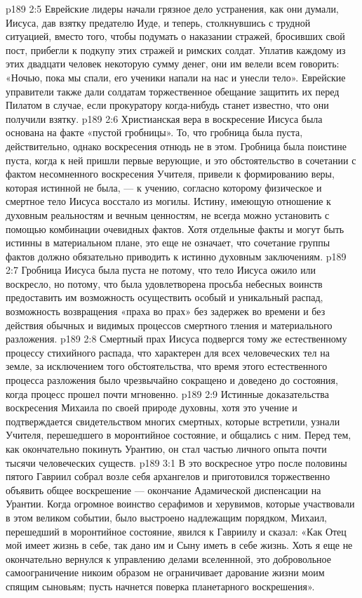 \vs p189 2:5 Еврейские лидеры начали грязное дело устранения, как они думали, Иисуса, дав взятку предателю Иуде, и теперь, столкнувшись с трудной ситуацией, вместо того, чтобы подумать о наказании стражей, бросивших свой пост, прибегли к подкупу этих стражей и римских солдат. Уплатив каждому из этих двадцати человек некоторую сумму денег, они им велели всем говорить: «Ночью, пока мы спали, его ученики напали на нас и унесли тело». Еврейские управители также дали солдатам торжественное обещание защитить их перед Пилатом в случае, если прокуратору когда\hyp{}нибудь станет известно, что они получили взятку.
\vs p189 2:6 \pc Христианская вера в воскресение Иисуса была основана на факте «пустой гробницы». То, что гробница была пуста, действительно,  однако  воскресения отнюдь не в этом. Гробница была поистине пуста, когда к ней пришли первые верующие, и это обстоятельство в сочетании с фактом несомненного воскресения Учителя, привели к формированию веры, которая истинной не была, --- к учению, согласно которому физическое и смертное тело Иисуса восстало из могилы. Истину, имеющую отношение к духовным реальностям и вечным ценностям, не всегда можно установить с помощью комбинации очевидных фактов. Хотя отдельные факты и могут быть истинны в материальном плане, это еще не означает, что сочетание группы фактов должно обязательно приводить к истинно духовным заключениям.
\vs p189 2:7 Гробница Иисуса была пуста не потому, что тело Иисуса ожило или воскресло, но потому, что была удовлетворена просьба небесных воинств предоставить им возможность осуществить особый и уникальный распад, возможность возвращения «праха во прах» без задержек во времени и без действия обычных и видимых процессов смертного тления и материального разложения.
\vs p189 2:8 Смертный прах Иисуса подвергся тому же естественному процессу стихийного распада, что характерен для всех человеческих тел на земле, за исключением того обстоятельства, что время этого естественного процесса разложения было чрезвычайно сокращено и доведено до состояния, когда процесс прошел почти мгновенно.
\vs p189 2:9 Истинные доказательства воскресения Михаила по своей природе духовны, хотя это учение и подтверждается свидетельством многих смертных, которые встретили, узнали Учителя, перешедшего в моронтийное состояние, и общались с ним. Перед тем, как окончательно покинуть Урантию, он стал частью личного опыта почти тысячи человеческих существ.
\vs p189 3:1 В это воскресное утро после половины пятого Гавриил собрал возле себя архангелов и приготовился торжественно объявить общее воскрешение --- окончание Адамической диспенсации на Урантии. Когда огромное воинство серафимов и херувимов, которые участвовали в этом великом событии, было выстроено надлежащим порядком, Михаил, перешедший в моронтийное состояние, явился к Гавриилу и сказал: «Как Отец мой имеет жизнь в себе, так дано им и Сыну иметь в себе жизнь. Хоть я еще не окончательно вернулся к управлению делами вселеннной, это добровольное самоограничение никоим образом не ограничивает дарование жизни моим спящим сыновьям; пусть начнется поверка планетарного воскрешения».
